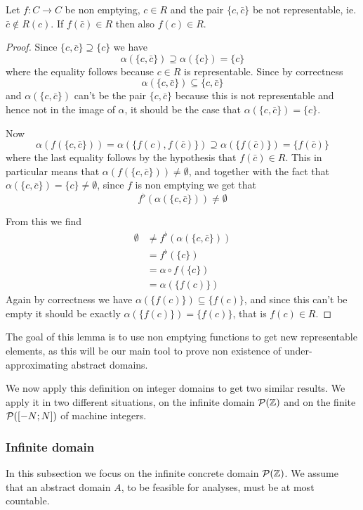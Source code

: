 \begin{lemma}\label{ch3:th:f-non-repr-pair}
	Let $f: C \rightarrow C$ be non emptying, $c \in R$ and the pair $\{ c, \bar{c} \}$ be not representable, ie. $\bar{c} \notin R(c)$. If $f(\bar{c}) \in R$ then also $f(c) \in R$.
\end{lemma}
\begin{proof}
	Since $\{ c, \bar{c} \} \supseteq \{ c \}$ we have
	\[
	\alpha(\{ c, \bar{c} \}) \supseteq \alpha(\{ c \}) = \{ c \}
	\]
	where the equality follows because $c \in R$ is representable. Since by correctness
	\[
	\alpha(\{ c, \bar{c} \}) \subseteq \{ c, \bar{c} \}
	\]
	and $\alpha(\{ c, \bar{c} \})$ can't be the pair $\{ c, \bar{c} \}$ because this is not representable and hence not in the image of $\alpha$, it should be the case that $\alpha(\{ c, \bar{c} \}) = \{ c \}$.
	
	Now
	\[
	\alpha(f(\{ c, \bar{c} \})) = \alpha(\{ f(c), f(\bar{c}) \}) \supseteq \alpha(\{ f(\bar{c}) \}) = \{ f(\bar{c}) \}
	\]
	where the last equality follows by the hypothesis that $f(\bar{c}) \in R$.
	This in particular means that $\alpha(f(\{ c, \bar{c} \})) \neq \emptyset$, and together with the fact that $\alpha(\{ c, \bar{c} \}) = \{ c \} \neq \emptyset$, since $f$ is non emptying we get that
	\[
	f^{\flat}(\alpha(\{ c, \bar{c} \})) \neq \emptyset
	\]
	
	From this we find
	\begin{align*}
		\emptyset &\neq f^{\flat}(\alpha(\{ c, \bar{c} \})) \\
		&= f^{\flat}(\{ c \}) \\
		&= \alpha \circ f(\{ c \}) \\
		&= \alpha(\{ f(c) \})
	\end{align*}
	Again by correctness we have $\alpha(\{ f(c) \}) \subseteq \{ f(c)\}$, and since this can't be empty it should be exactly $\alpha(\{ f(c) \}) = \{ f(c) \}$, that is $f(c) \in R$.
\end{proof}

The goal of this lemma is to use non emptying functions to get new representable elements, as this will be our main tool to prove non existence of under-approximating abstract domains.

We now apply this definition on integer domains to get two similar results. We apply it in two different situations, on the infinite domain $\mathcal{P}(\mathbb{Z})$ and on the finite $\mathcal{P}([-N; N])$ of machine integers.

\subsubsection{Infinite domain}
In this subsection we focus on the infinite concrete domain $\mathcal{P}(\mathbb{Z})$. We assume that an abstract domain $A$, to be feasible for analyses, must be at most countable.

